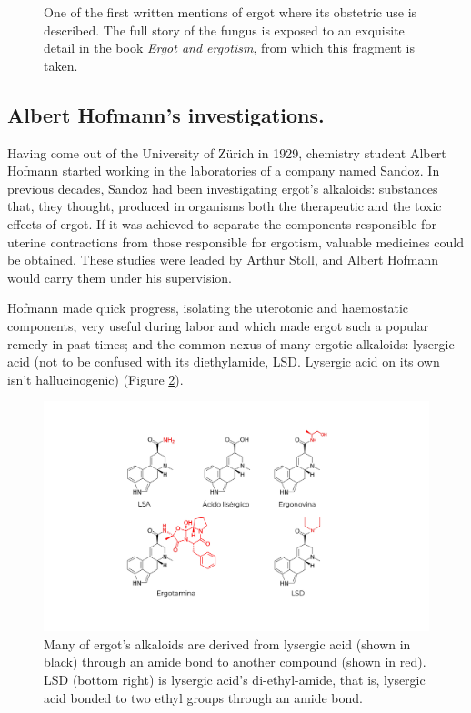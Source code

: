 \begin{figure}[H]
	\caption{One of the first written mentions of ergot where its obstetric use is described. The full story of the fungus is exposed to an exquisite detail in the book \textit{Ergot and ergotism}, from which this fragment is taken.}
	\label{ergotbook}
\end{figure}

\subsection{Albert Hofmann's investigations.}

Having come out of the University of Zürich in 1929, chemistry student Albert Hofmann started working in the laboratories of a company named Sandoz. In previous decades, Sandoz had been investigating ergot's alkaloids: substances that, they thought, produced in organisms both the therapeutic and the toxic effects of ergot. If it was achieved to separate the components responsible for uterine contractions from those responsible for ergotism, valuable medicines could be obtained. These studies were leaded by Arthur Stoll, and Albert Hofmann would carry them under his supervision. 

Hofmann made quick progress, isolating the uterotonic and haemostatic components, very useful during labor and which made ergot such a popular remedy in past times; and the common nexus of many ergotic alkaloids: lysergic acid (not to be confused with its diethylamide, LSD. Lysergic acid on its own isn't hallucinogenic) (Figure \ref{alkaloids}).

\begin{figure}[H]
	\centering
	\includegraphics[width=\linewidth]{media/2-alkaloids.png}
	\caption{Many of ergot's alkaloids are derived from lysergic acid (shown in black) through an amide bond to another compound (shown in red). LSD (bottom right) is lysergic acid's di-ethyl-amide, that is, lysergic acid bonded to two ethyl groups through an amide bond.}
	\label{alkaloids}
\end{figure}


